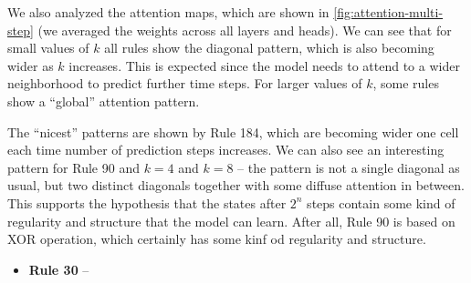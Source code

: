 \documentclass[runningheads]{llncs}
\begin{document}
We also analyzed the attention maps, which are shown in \cref{fig:attention-multi-step} (we averaged the weights across all layers and heads). We can see that for small values of $k$ all rules show the diagonal pattern, which is also becoming wider as $k$ increases. This is expected since the model needs to attend to a wider neighborhood to predict further time steps. For larger values of $k$, some rules show a ``global'' attention pattern.

The ``nicest'' patterns are shown by Rule 184, which are becoming wider one cell each time number of prediction steps increases. We can also see an interesting pattern for Rule 90 and $k = 4$ and $k = 8$ -- the pattern is not a single diagonal as usual, but two distinct diagonals together with some diffuse attention in between. This supports the hypothesis that the states after $2^n$ steps contain some kind of regularity and structure that the model can learn. After all, Rule 90 is based on XOR operation, which certainly has some kinf od regularity and structure.

\begin{itemize}
    \item \textbf{Rule 30} --
\end{itemize}
\end{document}
